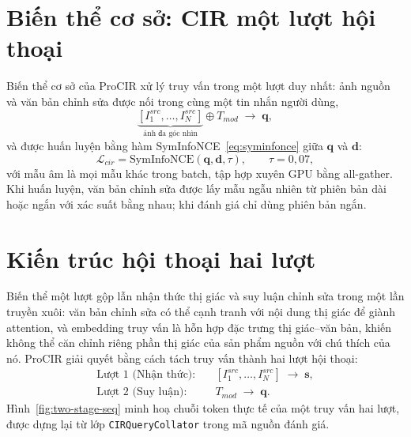 \section{Biến thể cơ sở: CIR một lượt hội thoại}

Biến thể cơ sở của ProCIR xử lý truy vấn trong một lượt duy nhất: ảnh nguồn và văn bản chỉnh sửa được nối trong cùng một tin nhắn người dùng,
\begin{equation}
    \underbrace{[I^{src}_1, \dots, I^{src}_N]}_{\text{ảnh đa góc nhìn}} \oplus T_{mod} \;\to\; \mathbf{q},
\end{equation}
và được huấn luyện bằng hàm SymInfoNCE~\eqref{eq:syminfonce} giữa $\mathbf{q}$ và $\mathbf{d}$:
\begin{equation}
    \mathcal{L}_{cir} = \mathrm{SymInfoNCE}(\mathbf{q}, \mathbf{d}, \tau), \qquad \tau = 0{,}07,
\end{equation}
với mẫu âm là mọi mẫu khác trong batch, tập hợp xuyên GPU bằng all-gather. Khi huấn luyện, văn bản chỉnh sửa được lấy mẫu ngẫu nhiên từ phiên bản dài hoặc ngắn với xác suất bằng nhau; khi đánh giá chỉ dùng phiên bản ngắn.

\section{Kiến trúc hội thoại hai lượt}\label{sec:two-stage}

Biến thể một lượt gộp lẫn nhận thức thị giác và suy luận chỉnh sửa trong một lần truyền xuôi: văn bản chỉnh sửa có thể cạnh tranh với nội dung thị giác để giành attention, và embedding truy vấn là hỗn hợp đặc trưng thị giác--văn bản, khiến không thể căn chỉnh riêng phần thị giác của sản phẩm nguồn với chú thích của nó. ProCIR giải quyết bằng cách tách truy vấn thành hai lượt hội thoại:
\begin{align}
    \text{Lượt 1 (Nhận thức):} &\quad [I^{src}_1, \dots, I^{src}_N] \;\to\; \mathbf{s}, \\
    \text{Lượt 2 (Suy luận):}  &\quad T_{mod} \;\to\; \mathbf{q}.
\end{align}
Hình~\ref{fig:two-stage-seq} minh hoạ chuỗi token thực tế của một truy vấn hai lượt, được dựng lại từ lớp \texttt{CIRQueryCollator} trong mã nguồn đánh giá.

